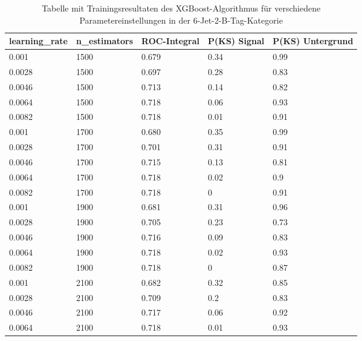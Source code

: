 \begin{table}[tbp]\parbox{12cm}{
\renewcommand\thetable{A.5}
  \caption[XGBoost 6j2t Ergebnisse]{Tabelle mit Trainingsresultaten des XGBoost-Algorithmus f\"ur verschiedene Parametereinstellungen in der 6-Jet-2-B-Tag-Kategorie}%
  }\label{tab:xgboost_6j2t}
  \begin{center}
  \begin{tabular}{lllll}
  \hline
  learning\_rate & n\_estimators & ROC-Integral & P(KS) Signal & P(KS) Untergrund\\
  \hline
\num{0,001}  & \num{1500} & \num{0,679} & \num{0,34} & \num{0,99}\\
\num{0,0028} & \num{1500} & \num{0,697} & \num{0,28} & \num{0,83}\\
\num{0,0046} & \num{1500} & \num{0,713} & \num{0,14} & \num{0,82}\\
\num{0,0064} & \num{1500} & \num{0,718} & \num{0,06} & \num{0,93}\\
\num{0,0082} & \num{1500} & \num{0,718} & \num{0,01} & \num{0,91}\\
\num{0,001}  & \num{1700} & \num{0,680} & \num{0,35} & \num{0,99}\\
\num{0,0028} & \num{1700} & \num{0,701} & \num{0,31} & \num{0,91}\\
\num{0,0046} & \num{1700} & \num{0,715} & \num{0,13} & \num{0,81}\\
\num{0,0064} & \num{1700} & \num{0,718} & \num{0,02} & \num{0,9}\\
\num{0,0082} & \num{1700} & \num{0,718} & \num{0}    & \num{0,91}\\
\num{0,001}  & \num{1900} & \num{0,681} & \num{0,31} & \num{0,96}\\
\num{0,0028} & \num{1900} & \num{0,705} & \num{0,23} & \num{0,73}\\
\num{0,0046} & \num{1900} & \num{0,716} & \num{0,09} & \num{0,83}\\
\num{0,0064} & \num{1900} & \num{0,718} & \num{0,02} & \num{0,93}\\
\num{0,0082} & \num{1900} & \num{0,718} & \num{0}    & \num{0,87}\\
\num{0,001}  & \num{2100} & \num{0,682} & \num{0,32} & \num{0,85}\\
\num{0,0028} & \num{2100} & \num{0,709} & \num{0,2}  & \num{0,83}\\
\num{0,0046} & \num{2100} & \num{0,717} & \num{0,06} & \num{0,92}\\
\num{0,0064} & \num{2100} & \num{0,718} & \num{0,01} & \num{0,93}\\

\end{tabular}
\end{center}
\end{table}
